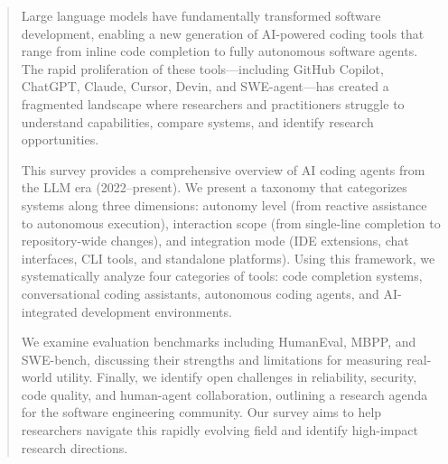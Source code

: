 \begin{abstract}
Large language models have fundamentally transformed software development, enabling a new generation of AI-powered coding tools that range from inline code completion to fully autonomous software agents. The rapid proliferation of these tools---including GitHub Copilot, ChatGPT, Claude, Cursor, Devin, and SWE-agent---has created a fragmented landscape where researchers and practitioners struggle to understand capabilities, compare systems, and identify research opportunities.

This survey provides a comprehensive overview of AI coding agents from the LLM era (2022--present). We present a taxonomy that categorizes systems along three dimensions: autonomy level (from reactive assistance to autonomous execution), interaction scope (from single-line completion to repository-wide changes), and integration mode (IDE extensions, chat interfaces, CLI tools, and standalone platforms). Using this framework, we systematically analyze four categories of tools: code completion systems, conversational coding assistants, autonomous coding agents, and AI-integrated development environments.

We examine evaluation benchmarks including HumanEval, MBPP, and SWE-bench, discussing their strengths and limitations for measuring real-world utility. Finally, we identify open challenges in reliability, security, code quality, and human-agent collaboration, outlining a research agenda for the software engineering community. Our survey aims to help researchers navigate this rapidly evolving field and identify high-impact research directions.
\end{abstract}
